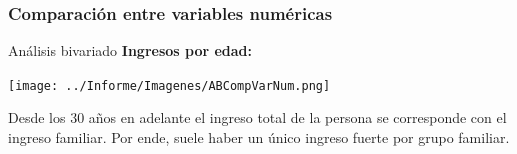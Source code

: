 \documentclass[pdf]{beamer}
\def\\{}%
\begin{document}
{    %


 
    \subsubsection{Comparación entre variables numéricas}

\begin{frame}{Análisis bivariado}
    \textbf{Ingresos por edad:}
    \begin{center}
        \texttt{[image: ../Informe/Imagenes/ABCompVarNum.png]}
    \end{center}
    Desde los 30 años en adelante el ingreso total de la persona se corresponde con el ingreso familiar. Por ende, suele haber un único ingreso fuerte por grupo familiar.


\end{frame}}
\end{document}
